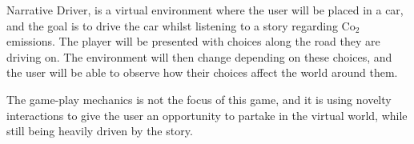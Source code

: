 Narrative Driver, is a virtual environment where the user will be placed in a car, and the goal is to drive the car whilst listening to a story regarding Co$_2$ emissions. The player will be presented with choices along the road they are driving on. The environment will then change depending on these choices, and the user will be able to observe how their choices affect the world around them. 

The game-play mechanics is not the focus of this game, and it is using novelty interactions to give the user an opportunity to partake in the virtual world, while still being heavily driven by the story.